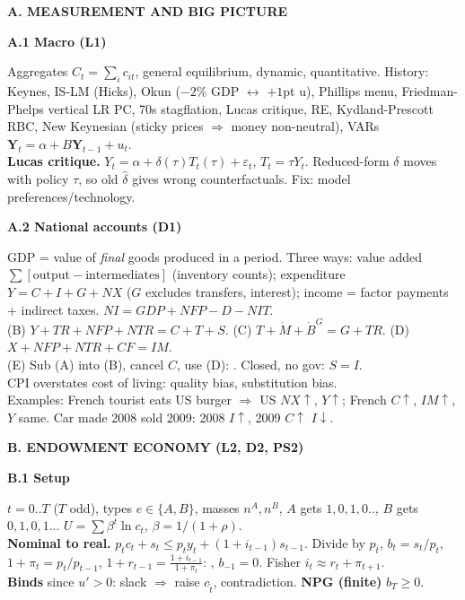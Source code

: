 \documentclass[12pt]{article}
\newcommand{\qhd}[1]{\par\vspace{4pt}%
  \colorbox{black!80}{\parbox{\dimexpr\linewidth-2\fboxsep}{\color{white}\bfseries #1}}\par\nopagebreak\vspace{2pt}}
\newcommand{\hd}[1]{\par\vspace{3pt}%
  \colorbox{black!12}{\parbox{\dimexpr\linewidth-2\fboxsep}{\bfseries #1}}\par\nopagebreak\vspace{1pt}}
\newcommand{\sub}[1]{\textbf{#1} }
\newcommand{\key}[1]{\fbox{$\displaystyle #1$}}
\begin{document}
\raggedbottom
\setlength{\rightskip}{0pt plus 3em}

\qhd{A. MEASUREMENT AND BIG PICTURE}

\hd{A.1 Macro (L1)}
Aggregates $C_t=\sum_ic_{it}$, general equilibrium, dynamic, quantitative.
History: Keynes, IS-LM (Hicks), Okun ($-2\%$ GDP $\leftrightarrow$ $+1$pt u),
Phillips menu, Friedman-Phelps vertical LR PC, 70s stagflation, Lucas critique,
RE, Kydland-Prescott RBC, New Keynesian (sticky prices $\Rightarrow$ money
non-neutral), VARs $\mathbf Y_t=\alpha+B\mathbf Y_{t-1}+u_t$.\\
\sub{Lucas critique.} $Y_t=\alpha+\delta(\tau)T_t(\tau)+\varepsilon_t$, $T_t=\tau Y_t$.
Reduced-form $\delta$ moves with policy $\tau$, so old $\hat\delta$ gives wrong
counterfactuals. Fix: model preferences/technology.

\hd{A.2 National accounts (D1)}
GDP = value of \emph{final} goods produced in a period. Three ways:
value added $\sum[\text{output}-\text{intermediates}]$ (inventory counts);
expenditure $Y=C+I+G+NX$ ($G$ excludes transfers, interest);
income = factor payments + indirect taxes. $NI=GDP+NFP-D-NIT$.\\
(B) $Y+TR+NFP+NTR=C+T+S$. (C) $T+\dot M+\dot B^G=G+TR$.
(D) $X+NFP+NTR+CF=IM$.\\
(E) Sub (A) into (B), cancel $C$, use (D):
\key{I=S+(T-G-TR)+CF}. Closed, no gov: $S=I$.\\
CPI overstates cost of living: quality bias, substitution bias.\\
Examples: French tourist eats US burger $\Rightarrow$ US $NX\uparrow$, $Y\uparrow$;
French $C\uparrow$, $IM\uparrow$, $Y$ same. Car made 2008 sold 2009: 2008 $I\uparrow$,
2009 $C\uparrow$ $I\downarrow$.

\qhd{B. ENDOWMENT ECONOMY (L2, D2, PS2)}

\hd{B.1 Setup}
$t=0..T$ ($T$ odd), types $e\in\{A,B\}$, masses $n^A,n^B$, $A$ gets $1,0,1,0..$,
$B$ gets $0,1,0,1..$. $U=\sum\beta^t\ln c_t$, $\beta=1/(1+\rho)$.\\
\sub{Nominal to real.} $p_tc_t+s_t\le p_ty_t+(1+i_{t-1})s_{t-1}$. Divide by $p_t$,
$b_t=s_t/p_t$, $1+\pi_t=p_t/p_{t-1}$, $1+r_{t-1}=\frac{1+i_{t-1}}{1+\pi_t}$:
\key{c_t+b_t\le y_t+(1+r_{t-1})b_{t-1}}, $b_{-1}=0$. Fisher $i_t\approx r_t+\pi_{t+1}$.\\
\sub{Binds} since $u'>0$: slack $\Rightarrow$ raise $c_{\tilde t}$, contradiction.
\sub{NPG (finite)} $b_T\ge0$.
\end{document}
